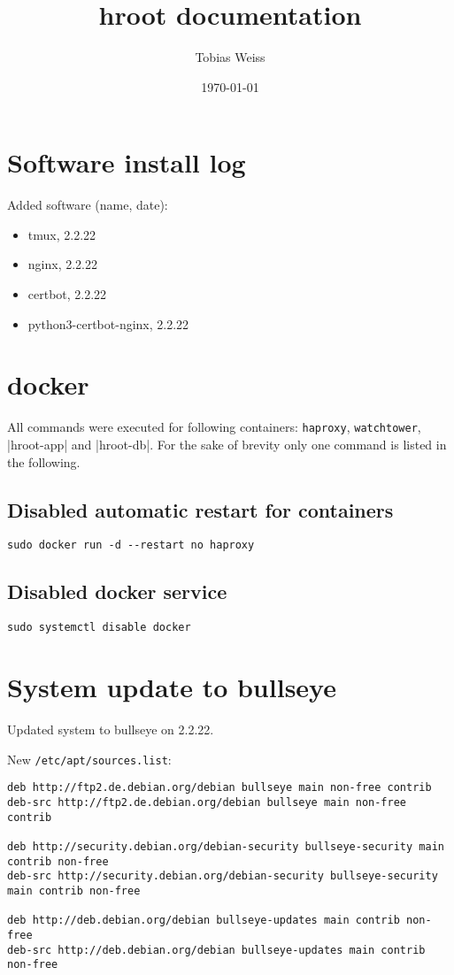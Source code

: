 \documentclass{article}
\title{hroot documentation}
\author{Tobias Weiss}
\date{\today}
\begin{document}
\maketitle

\section{Software install log}
Added software (name, date):
\begin{itemize}
    \item tmux, 2.2.22
    \item nginx, 2.2.22
    \item certbot, 2.2.22
    \item python3-certbot-nginx, 2.2.22
\end{itemize}

\section{docker}

All commands were executed for following containers: \verb|haproxy|, \verb|watchtower|, |hroot-app| and |hroot-db|. For the sake of brevity only one command is listed in the following.

\subsection{Disabled automatic restart for containers}

\begin{lstlisting}
sudo docker run -d --restart no haproxy
\end{lstlisting}

\subsection{Disabled docker service}

\begin{lstlisting}
sudo systemctl disable docker
\end{lstlisting}

\section{System update to bullseye}

Updated system to bullseye on 2.2.22.

New \verb|/etc/apt/sources.list|:
\begin{lstlisting}
deb http://ftp2.de.debian.org/debian bullseye main non-free contrib
deb-src http://ftp2.de.debian.org/debian bullseye main non-free contrib

deb http://security.debian.org/debian-security bullseye-security main contrib non-free
deb-src http://security.debian.org/debian-security bullseye-security main contrib non-free

deb http://deb.debian.org/debian bullseye-updates main contrib non-free
deb-src http://deb.debian.org/debian bullseye-updates main contrib non-free

\end{lstlisting}
\end{document}
